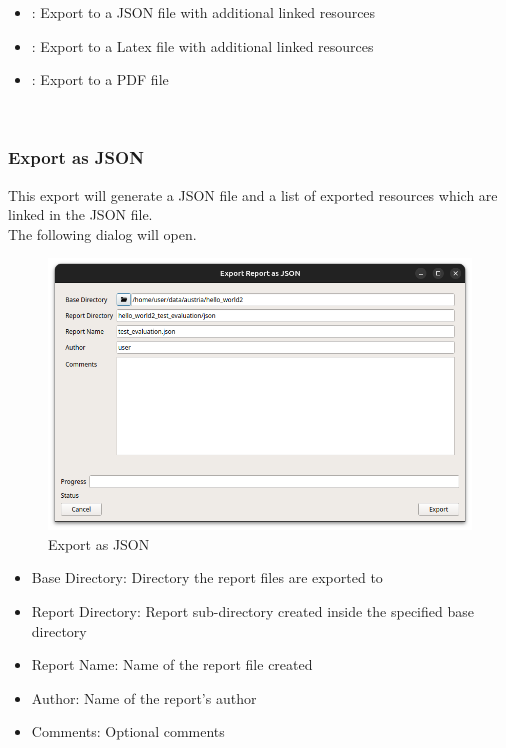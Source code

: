\begin{itemize}
  \item {}: Export to a JSON file with additional linked resources
  \item {}: Export to a Latex file with additional linked resources
  \item {}: Export to a PDF file
\end{itemize} 
\  \\

\subsubsection{Export as JSON}
\label{sec:report_export_json}

This export will generate a JSON file and a list of exported resources which are linked in the JSON file. \\

The following dialog will open.

\begin{figure}[H]
    \hspace*{-2.5cm}
    \center
    \includegraphics[width=14cm]{figures/export_json.png}
  \caption{Export as JSON}
\end{figure}

\begin{itemize}  
    \item Base Directory: Directory the report files are exported to
    \item Report Directory: Report sub-directory created inside the specified base directory
    \item Report Name: Name of the report file created
    \item Author: Name of the report's author 
    \item Comments: Optional comments
\end{itemize}
\ \\

